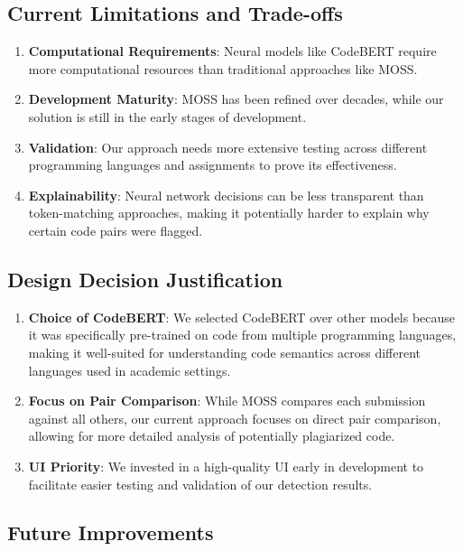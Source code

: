 \documentclass[12pt, titlepage]{article}
\begin{document}
\subsection{Current Limitations and Trade-offs}

\begin{enumerate}
    \item \textbf{Computational Requirements}: Neural models like CodeBERT require more computational resources than traditional approaches like MOSS.

    \item \textbf{Development Maturity}: MOSS has been refined over decades, while our solution is still in the early stages of development.

    \item \textbf{Validation}: Our approach needs more extensive testing across different programming languages and assignments to prove its effectiveness.

    \item \textbf{Explainability}: Neural network decisions can be less transparent than token-matching approaches, making it potentially harder to explain why certain code pairs were flagged.
\end{enumerate}

\subsection{Design Decision Justification}

\begin{enumerate}
    \item \textbf{Choice of CodeBERT}: We selected CodeBERT over other models because it was specifically pre-trained on code from multiple programming languages, making it well-suited for understanding code semantics across different languages used in academic settings.

    \item \textbf{Focus on Pair Comparison}: While MOSS compares each submission against all others, our current approach focuses on direct pair comparison, allowing for more detailed analysis of potentially plagiarized code.

    \item \textbf{UI Priority}: We invested in a high-quality UI early in development to facilitate easier testing and validation of our detection results.
\end{enumerate}

\subsection{Future Improvements}
\end{document}
